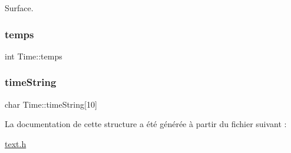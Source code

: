 Surface. \mbox{\label{structTime_a11f3327ad1d256262bfa22b7e0553b60}} 
\subsubsection{\texorpdfstring{temps}{temps}}
{\footnotesize\ttfamily int Time\+::temps}

\mbox{\label{structTime_a6d30063c4d2f746ce34949138a2be479}} 
\subsubsection{\texorpdfstring{time\+String}{timeString}}
{\footnotesize\ttfamily char Time\+::time\+String\mbox{[}10\mbox{]}}



La documentation de cette structure a été générée à partir du fichier suivant \+:\begin{DoxyCompactItemize}
\item 
\hyperlink{text_8h}{text.\+h}\end{DoxyCompactItemize}
